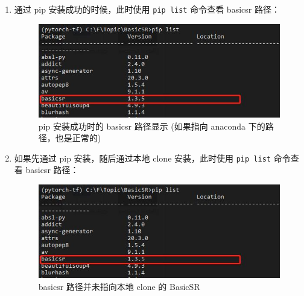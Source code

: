 \documentclass[../main.tex]{subfiles}
\begin{document}
\begin{enumerate}
\begin{enumerate}
    \item 通过 pip 安装成功的时候，此时使用 \texttt{pip list} 命令查看 basicsr 路径：
    \begin{figure}[H]
    \begin{center}
        \includegraphics[width=0.7\linewidth]{figures/installation_pip_install_location.jpg}
        \caption{pip 安装成功时的 basicsr 路径显示 (如果指向 anaconda 下的路径，也是正常的)}
        \label{fig:correct-pip-install}
    \end{center}
    \vspace{-0.5cm}
    \end{figure}

    \item 如果先通过 pip 安装，随后通过本地 clone 安装，此时使用 \texttt{pip list} 命令查看 basicsr 路径：
    \begin{figure}[H]
    \begin{center}
        \includegraphics[width=0.7\linewidth]{figures/installation_pip_install_location.jpg}
        \caption{basicsr 路径并未指向本地 clone 的 BasicSR}
        \label{fig:false-clone-install}
    \end{center}
    \vspace{-0.5cm}
    \end{figure}


\end{enumerate}
\end{enumerate}
\end{document}
